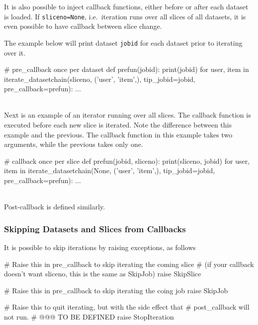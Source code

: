 It is also possible to inject callback functions, either before or
after each dataset is loaded.  If \texttt{sliceno=None},
i.e.\ iteration runs over all slices of all datasets, it is even
possible to have callback between slice change.

The example below will print dataset \texttt{jobid} for each dataset
prior to iterating over it.
\\
\begin{python}
# pre_callback once per dataset
def prefun(jobid):
    print(jobid)
for user, item in iterate_datasetchain(sliceno, ('user', 'item',), tip_jobid=jobid,
                                       pre_callback=prefun):
    ...
\end{python}
\\
Next is an example of an iterator running over all slices.
The callback function is executed before each new slice is iterated.
Note the difference between this example and the previous.  The
callback function in this example takes two arguments, while the
previous takes only one.

\begin{python}
# callback once per slice
def prefun(jobid, sliceno):
    print(sliceno, jobid)
for user, item in iterate_datasetchain(None, ('user', 'item',), tip_jobid=jobid,
                                       pre_callback=prefun):
    ...
\end{python}
\\
Post-callback is defined similarly.



\subsubsection*{Skipping Datasets and Slices from Callbacks}
It is possible to skip iterations by raising exceptions, as follows
\\
\begin{python}

# Raise this in pre_callback to skip iterating the coming slice
# (if your callback doesn't want sliceno, this is the same as SkipJob)
raise SkipSlice

# Raise this in pre_callback to skip iterating the coing job
raise SkipJob

# Raise this to quit iterating, but with the side effect that
# post_callback will not run.
# @@@ TO BE DEFINED
raise StopIteration
\end{python}
